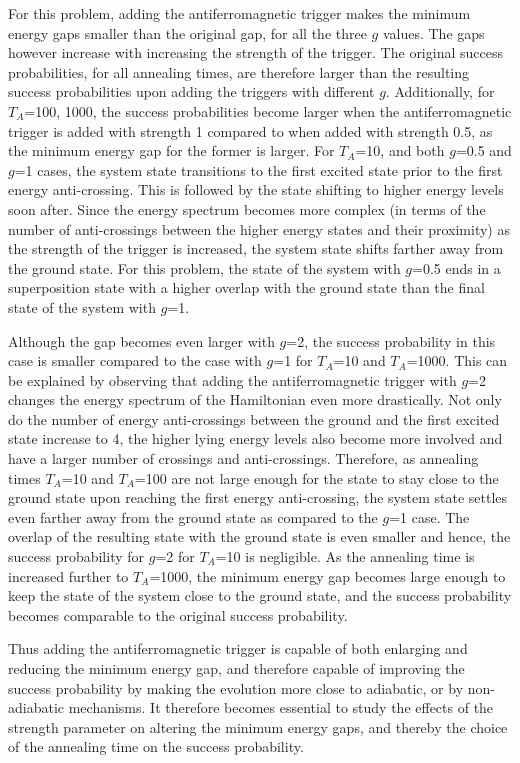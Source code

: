\documentclass[../main.tex]{subfiles}
\begin{document}
For this problem, adding the antiferromagnetic trigger makes the minimum energy gaps smaller than the original gap, for all the three $g$ values. The gaps however increase with increasing the strength of the trigger. The original success probabilities, for all annealing times, are therefore larger than the resulting success probabilities upon adding the triggers with different $g$. Additionally, for $T_A$=100, 1000, the success probabilities become larger when the antiferromagnetic trigger is added with strength 1 compared to when added with strength 0.5, as the minimum energy gap for the former is larger. For $T_A$=10, and both $g$=0.5 and $g$=1 cases, the system state transitions to the first excited state prior to the first energy anti-crossing. This is followed by the state shifting to higher energy levels soon after. Since the energy spectrum becomes more complex (in terms of the number of anti-crossings between the higher energy states and their proximity) as the strength of the trigger is increased, the system state shifts farther away from the ground state. For this problem, the state of the system with $g$=0.5 ends in a superposition state with a higher overlap with the ground state than the final state of the system with $g$=1.

Although the gap becomes even larger with $g$=2, the success probability in this case is smaller compared to the case with $g$=1 for $T_A$=10 and $T_A$=1000. This can be explained by observing that adding the antiferromagnetic trigger with $g$=2 changes the energy spectrum of the Hamiltonian even more drastically. Not only do the number of energy anti-crossings between the ground and the first excited state increase to 4, the higher lying energy levels also become more involved and have a larger number of crossings and anti-crossings. Therefore, as annealing times $T_A$=10 and $T_A$=100 are not large enough for the state to stay close to the ground state upon reaching the first energy anti-crossing, the system state settles even farther away from the ground state as compared to the $g$=1 case. The overlap of the  resulting state with the ground state is even smaller and hence, the success probability for $g$=2 for $T_A$=10 is negligible. As the annealing time is increased further to $T_A$=1000, the minimum energy gap becomes large enough to keep the state of the system close to the ground state, and the success probability becomes comparable to the original success probability.

Thus adding the antiferromagnetic trigger is capable of both enlarging and reducing the minimum energy gap, and therefore capable of improving the success probability by making the evolution more close to adiabatic, or by non-adiabatic mechanisms. It therefore becomes essential to study the effects of the strength parameter on altering the minimum energy gaps, and thereby the choice of the annealing time on the success probability.
 
\end{document}
